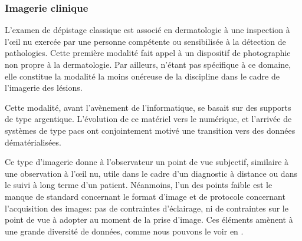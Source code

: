 \subsubsection{Imagerie clinique}
L’examen de dépistage classique est associé en dermatologie à une inspection à l’œil nu exercée par une personne compétente ou sensibilisée à la détection de pathologies. Cette première modalité fait appel à un dispositif de photographie non propre à la dermatologie. Par ailleurs, n’étant pas spécifique à ce domaine, elle constitue la modalité la moins onéreuse de la discipline dans le cadre de l’imagerie des lésions.\par
Cette modalité, avant l’avènement de l’informatique, se basait sur des supports de type argentique. L’évolution de ce matériel vers le numérique, et l’arrivée de systèmes de type \gls{pacs} ont conjointement motivé une transition vers des données dématérialisées.\par
Ce type d’imagerie donne à l’observateur un point de vue subjectif, similaire à une observation à l’œil nu, utile dans le cadre d’un diagnostic à distance ou dans le suivi à long terme d’un patient. Néanmoins, l'un des points faible est le manque de standard concernant le format d'image et de protocole concernant l'acquisition des images: pas de contraintes d'éclairage, ni de contraintes sur le point de vue à adopter au moment de la prise d'image. Ces éléments amènent à une grande diversité de données, comme nous pouvons le voir en .\par
